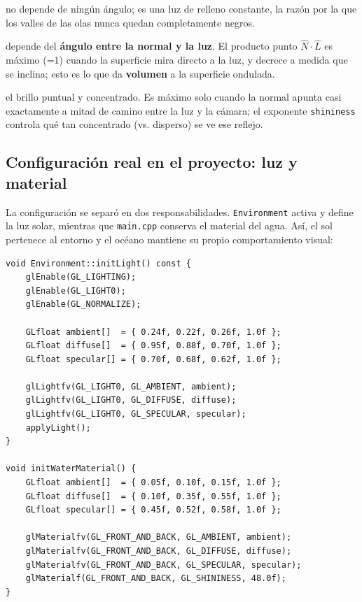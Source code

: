 ﻿\documentclass[11pt]{article}
\begin{document}
\begin{description}[leftmargin=1.2em]
  \item[Ambiental ($k_a L_a$):] no depende de ningún ángulo; es una luz de
        relleno constante, la razón por la que los valles de las olas nunca
        quedan completamente negros.
  \item[Difusa ($k_d L_d (\hat N \cdot \hat L)$):] depende del \textbf{ángulo
        entre la normal y la luz}. El producto punto $\hat N \cdot \hat L$ es
        máximo (=1) cuando la superficie mira directo a la luz, y decrece a
        medida que se inclina; esto es lo que da \textbf{volumen} a la
        superficie ondulada.
  \item[Especular ($k_s L_s (\hat N \cdot \hat H)^{\text{shininess}}$):] el
        brillo puntual y concentrado. Es máximo solo cuando la normal apunta
        casi exactamente a mitad de camino entre la luz y la cámara; el
        exponente \texttt{shininess} controla qué tan concentrado (vs.
        disperso) se ve ese reflejo.
\end{description}

\subsection{Configuración real en el proyecto: luz y material}

La configuración se separó en dos responsabilidades. \texttt{Environment}
activa y define la luz solar, mientras que \texttt{main.cpp} conserva el
material del agua. Así, el sol pertenece al entorno y el océano mantiene su
propio comportamiento visual:

\begin{lstlisting}
void Environment::initLight() const {
    glEnable(GL_LIGHTING);
    glEnable(GL_LIGHT0);
    glEnable(GL_NORMALIZE);

    GLfloat ambient[]  = { 0.24f, 0.22f, 0.26f, 1.0f };
    GLfloat diffuse[]  = { 0.95f, 0.88f, 0.70f, 1.0f };
    GLfloat specular[] = { 0.70f, 0.68f, 0.62f, 1.0f };

    glLightfv(GL_LIGHT0, GL_AMBIENT, ambient);
    glLightfv(GL_LIGHT0, GL_DIFFUSE, diffuse);
    glLightfv(GL_LIGHT0, GL_SPECULAR, specular);
    applyLight();
}

void initWaterMaterial() {
    GLfloat ambient[]  = { 0.05f, 0.10f, 0.15f, 1.0f };
    GLfloat diffuse[]  = { 0.10f, 0.35f, 0.55f, 1.0f };
    GLfloat specular[] = { 0.45f, 0.52f, 0.58f, 1.0f };

    glMaterialfv(GL_FRONT_AND_BACK, GL_AMBIENT, ambient);
    glMaterialfv(GL_FRONT_AND_BACK, GL_DIFFUSE, diffuse);
    glMaterialfv(GL_FRONT_AND_BACK, GL_SPECULAR, specular);
    glMaterialf(GL_FRONT_AND_BACK, GL_SHININESS, 48.0f);
}
\end{lstlisting}
\end{document}
